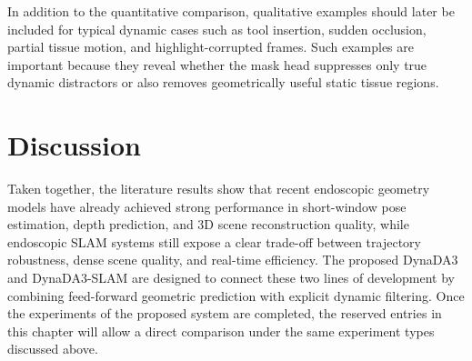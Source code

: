In addition to the quantitative comparison, qualitative examples should later be included for typical dynamic cases such as tool insertion, sudden occlusion, partial tissue motion, and highlight-corrupted frames. Such examples are important because they reveal whether the mask head suppresses only true dynamic distractors or also removes geometrically useful static tissue regions.

\section{Discussion}
Taken together, the literature results show that recent endoscopic geometry models have already achieved strong performance in short-window pose estimation, depth prediction, and 3D scene reconstruction quality, while endoscopic SLAM systems still expose a clear trade-off between trajectory robustness, dense scene quality, and real-time efficiency. The proposed DynaDA3 and DynaDA3-SLAM are designed to connect these two lines of development by combining feed-forward geometric prediction with explicit dynamic filtering. Once the experiments of the proposed system are completed, the reserved entries in this chapter will allow a direct comparison under the same experiment types discussed above.
